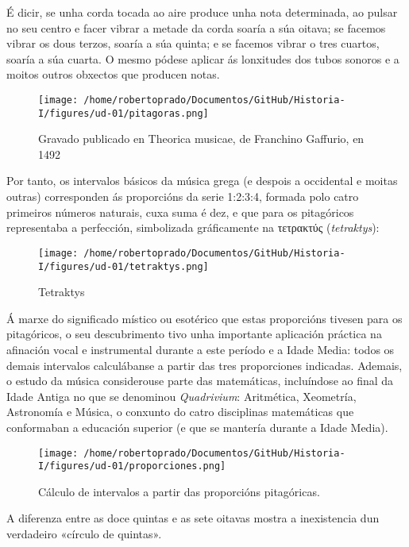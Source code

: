 É dicir, se unha corda tocada ao aire produce unha nota determinada, ao
pulsar no seu centro e facer vibrar a metade da corda soaría a súa
oitava; se facemos vibrar os dous terzos, soaría a súa quinta; e se
facemos vibrar o tres cuartos, soaría a súa cuarta. O mesmo pódese
aplicar ás lonxitudes dos tubos sonoros e a moitos outros obxectos que
producen notas.

\begin{figure}
\centering
\texttt{[image: /home/robertoprado/Documentos/GitHub/Historia-I/figures/ud-01/pitagoras.png]}
\caption{Gravado publicado en Theorica  musicae, de Franchino Gaffurio, en 1492}
\end{figure}

Por tanto, os intervalos básicos da música grega (e despois a occidental
e moitas outras) corresponden ás proporcións da serie 1:2:3:4, formada
polo catro primeiros números naturais, cuxa suma é dez, e que para os
pitagóricos representaba a perfección, simbolizada gráficamente na
τετρακτύς (\emph{tetraktys}):

\begin{wrapfigure}{l}{0.30\textwidth}
\begin{center}
\texttt{[image: /home/robertoprado/Documentos/GitHub/Historia-I/figures/ud-01/tetraktys.png]}
\end{center}
\caption{Tetraktys}
\end{wrapfigure}

Á marxe do significado místico ou esotérico que estas proporcións
tivesen para os pitagóricos, o seu descubrimento tivo unha importante
aplicación práctica na afinación vocal e instrumental durante a este
período e a Idade Media: todos os demais intervalos calculábanse a
partir das tres proporciones indicadas. Ademais, o estudo da música
considerouse parte das matemáticas, incluíndose ao final da Idade Antiga
no que se denominou \emph{Quadrivium}: Aritmética, Xeometría, Astronomía
e Música, o conxunto do catro disciplinas matemáticas que conformaban a
educación superior (e que se mantería durante a Idade Media).

\begin{figure}
\centering
\texttt{[image: /home/robertoprado/Documentos/GitHub/Historia-I/figures/ud-01/proporciones.png]}
\caption{Cálculo de intervalos a partir das proporcións pitagóricas.}
\end{figure}

A diferenza entre as doce quintas e as sete oitavas mostra a
inexistencia dun verdadeiro «círculo de quintas».

